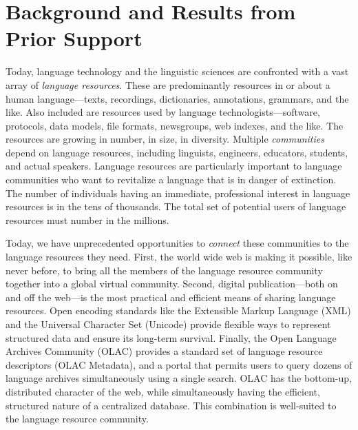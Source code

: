 \section{Background and Results from Prior Support}


Today, language technology and the linguistic sciences are confronted
with a vast array of \emph{language resources}.  These are
predominantly resources in or about a human language---texts, recordings, 
dictionaries, annotations, grammars, and the like.
Also included are resources used by language technologists---software,
protocols, data models, file formats, newsgroups, web
indexes, and the like.  The resources are growing
in number, in size, in diversity.  Multiple \emph{communities} depend
on language resources, including linguists, engineers, educators, students, and
actual speakers.  Language resources are particularly important to 
language communities who want to revitalize
a language that is in danger of extinction.
The number of individuals having an immediate, professional interest in language
resources is in the tens of thousands. The total set of potential users
of language resources must number in the millions.


Today, we have unprecedented opportunities to \emph{connect} these
communities to the language resources they need.  First, 
the world wide web is making it possible, like never before, to bring
all the members of the language resource community together into 
a global virtual community. 
Second, digital publication---both on and off
the web---is the most practical and efficient means of
sharing language resources.  
Open encoding standards like the Extensible Markup Language (XML) 
and the Universal Character Set (Unicode)
provide flexible ways to represent structured data and ensure its
long-term survival. 
Finally, the Open Language Archives Community (OLAC) provides a 
standard set of language resource descriptors (OLAC Metadata), 
and a portal that permits users to query dozens of language 
archives simultaneously using a single search. OLAC has the
bottom-up, distributed character of the web, while simultaneously
having the efficient, structured nature of a centralized database.
This combination is well-suited to the language resource community.

